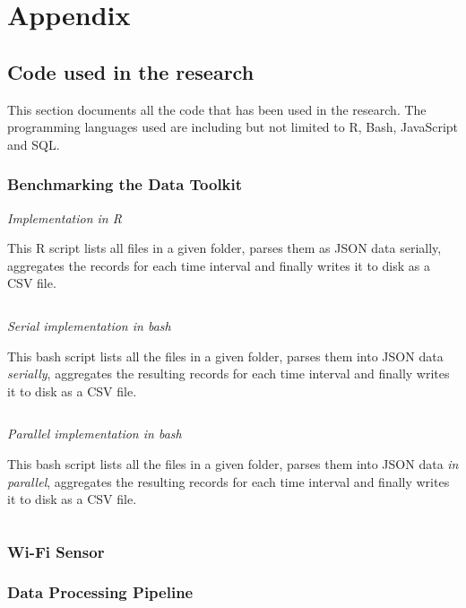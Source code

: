 \chapter{Appendix}


\section{Code used in the research}

This section documents all the code that has been used in the research.
The programming languages used are including but not limited to R, Bash, JavaScript and SQL.

\subsection{Benchmarking the Data Toolkit} \label{appendix:benchmark}

\vspace{1.5em}\noindent\textit{Implementation in R}\vspace{0.5em}

This R script lists all files in a given folder, parses them as JSON data serially, aggregates the records for each time interval and finally writes it to disk as a CSV file.
\vspace{1em}
\inputminted{R}{analysis/data-toolkit/old-toolkit.r}

\vspace{1.5em}\noindent\textit{Serial implementation in bash}\vspace{0.5em}

This bash script lists all the files in a given folder, parses them into JSON data \textit{serially}, aggregates the resulting records for each time interval and finally writes it to disk as a CSV file.
\vspace{1em}
\inputminted{bash}{analysis/data-toolkit/new-toolkit.sh}

\vspace{1.5em}\noindent\textit{Parallel implementation in bash}\vspace{0.5em}

This bash script lists all the files in a given folder, parses them into JSON data \textit{in parallel}, aggregates the resulting records for each time interval and finally writes it to disk as a CSV file.
\vspace{1em}
\inputminted{bash}{analysis/data-toolkit/new-toolkit-parallel.sh}

\subsection{Wi-Fi Sensor}

\subsection{Data Processing Pipeline}

